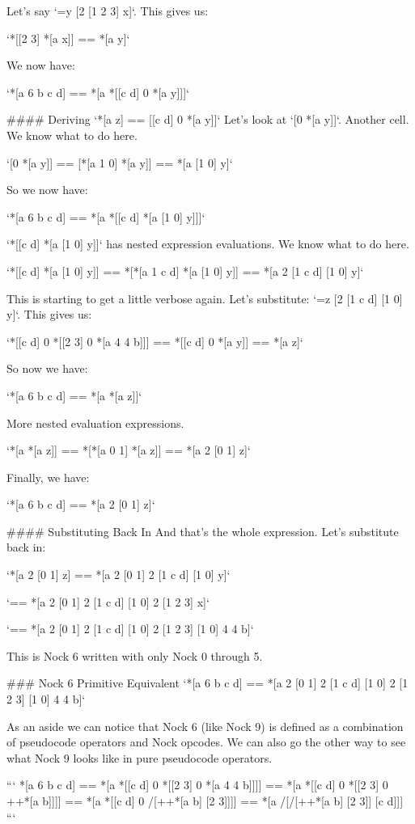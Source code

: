 \documentclass[twoside]{article}
\begin{document}
Let's say `=y [2 [1 2 3] x]`. This gives us:

`*[[2 3] *[a x]] == *[a y]`

We now have:

`*[a 6 b c d] == *[a *[[c d] 0 *[a y]]]`

#### Deriving `*[a z] == [[c d] 0 *[a y]]`
Let's look at `[0 *[a y]]`. Another cell. We know what to do here.

`[0 *[a y]] == [*[a 1 0] *[a y]] == *[a [1 0] y]`

So we now have:

`*[a 6 b c d] == *[a *[[c d] *[a [1 0] y]]]`

`*[[c d] *[a [1 0] y]]` has nested expression evaluations. We know what to do here.

`*[[c d] *[a [1 0] y]] == *[*[a 1 c d] *[a [1 0] y]] == *[a 2 [1 c d] [1 0] y]`

This is starting to get a little verbose again. Let's substitute:
`=z [2 [1 c d] [1 0] y]`. This gives us:

`*[[c d] 0 *[[2 3] 0 *[a 4 4 b]]] == *[[c d] 0 *[a y]] == *[a z]`

So now we have:

`*[a 6 b c d] == *[a *[a z]]`

More nested evaluation expressions.

`*[a *[a z]] == *[*[a 0 1] *[a z]] == *[a 2 [0 1] z]`

Finally, we have:

`*[a 6 b c d] == *[a 2 [0 1] z]`

#### Substituting Back In
And that's the whole expression. Let's substitute back in:

`*[a 2 [0 1] z] == *[a 2 [0 1] 2 [1 c d] [1 0] y]`

`== *[a 2 [0 1] 2 [1 c d] [1 0] 2 [1 2 3] x]`

`== *[a 2 [0 1] 2 [1 c d] [1 0] 2 [1 2 3] [1 0] 4 4 b]`

This is Nock 6 written with only Nock 0 through 5.

### Nock 6 Primitive Equivalent
`*[a 6 b c d] == *[a 2 [0 1] 2 [1 c d] [1 0] 2 [1 2 3] [1 0] 4 4 b]`

As an aside we can notice that Nock 6 (like Nock 9) is defined as a combination of pseudocode operators and Nock opcodes. We can also go the other way to see what Nock 9 looks like in pure pseudocode operators.

```
*[a 6 b c d]
== *[a *[[c d] 0 *[[2 3] 0 *[a 4 4 b]]]]
== *[a *[[c d] 0 *[[2 3] 0 ++*[a b]]]]
== *[a *[[c d] 0 /[++*[a b] [2 3]]]]
== *[a /[/[++*[a b] [2 3]] [c d]]]
```
\end{document}
